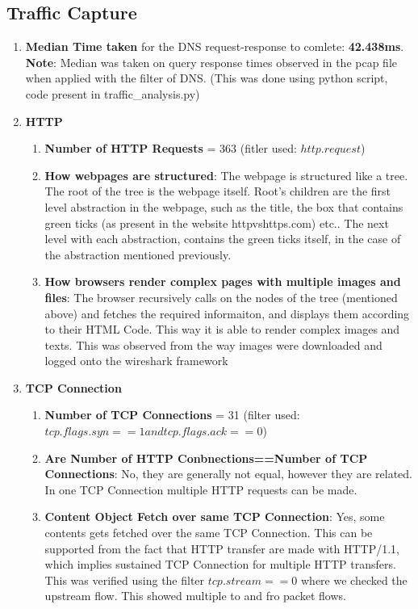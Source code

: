 \documentclass[12pt]{article}
\begin{document}
\subsection{Traffic Capture}
\renewcommand{\labelenumi}{\Alph{enumi}}
\begin{enumerate}
    \item \textbf{Median Time taken} for the DNS request-response to comlete: \textbf{42.438ms}. \textbf{Note}: Median was taken on query response times observed in the pcap file when applied with the filter of DNS. (This was done using python script, code present in traffic\_analysis.py)
    \item \textbf{HTTP}
    \begin{enumerate}
        \item \textbf{Number of HTTP Requests} = 363 (fitler used: $http.request$)
        \item \textbf{How webpages are structured}: The webpage is structured like a tree. The root of the tree is the webpage itself. Root's children are the first level abstraction in the webpage, such as the title, the box that contains green ticks (as present in the website httpvshttps.com) etc.. The next level with each abstraction, contains the green ticks itself, in the case of the abstraction mentioned previously. 
        \item \textbf{How browsers render complex pages with multiple images and files}: The browser recursively calls on the nodes of the tree (mentioned above) and fetches the required informaiton, and displays them according to their HTML Code. This way it is able to render complex images and texts. This was observed from the way images were downloaded and logged onto the wireshark framework
    \end{enumerate}
    \item \textbf{TCP Connection}
    \begin{enumerate}
        \item \textbf{Number of TCP Connections} = 31 (filter used: $tcp.flags.syn == 1 and tcp.flags.ack == 0$)
        \item \textbf{Are Number of HTTP Conbnections==Number of TCP Connections}: No, they are generally not equal, however they are related. In one TCP Connection multiple HTTP requests can be made.
        \item \textbf{Content Object Fetch over same TCP Connection}: Yes, some contents gets fetched over the same TCP Connection. This can be supported from the fact that HTTP transfer are made with HTTP/1.1, which implies sustained TCP Connection for multiple HTTP transfers. This was verified using the filter $tcp.stream == 0$ where we checked the upstream flow. This showed multiple to and fro packet flows.

\end{enumerate}
\end{enumerate}
\end{document}
